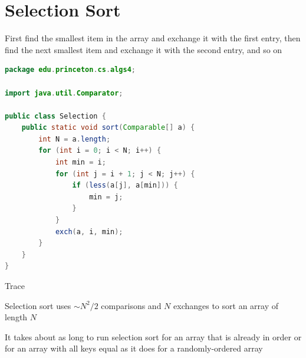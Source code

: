 \documentclass[8pt,a4paper,compress]{beamer}
\begin{document}
\section{Selection Sort}
\begin{frame}[fragile]
\pause

First find the smallest item in the array and exchange it with the first entry, then find the next smallest item and exchange it with the second entry, and so on

\pause
\bigskip

\begin{lstlisting}[language=Java]
package edu.princeton.cs.algs4;

import java.util.Comparator;

public class Selection {
    public static void sort(Comparable[] a) {
        int N = a.length;
        for (int i = 0; i < N; i++) {
            int min = i;
            for (int j = i + 1; j < N; j++) {
                if (less(a[j], a[min])) { 
                    min = j;
                }
            }
            exch(a, i, min);
        }
    }
}
\end{lstlisting}
\end{frame}

\begin{frame}[fragile]
\pause

Trace
\begin{center}
\end{center}
\end{frame}

\begin{frame}[fragile]
\pause

Selection sort uses $\sim N^2/2$ comparisons and $N$ exchanges to sort an array of length $N$

\pause
\bigskip

It takes about as long to run selection sort for an array that is already in order or for an array with all keys equal as it does for a randomly-ordered array
\end{frame}
\end{document}
